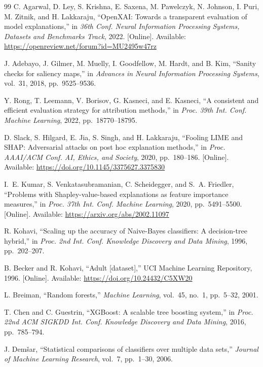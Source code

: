 \documentclass{cleiej}
\begin{document}
\begin{thebibliography}{99}
C. Agarwal, D. Ley, S. Krishna, E. Saxena, M. Pawelczyk, N. Johnson,
I. Puri, M. Zitnik, and H. Lakkaraju, ``OpenXAI: Towards a transparent
evaluation of model explanations,'' in \emph{36th Conf. Neural Information
Processing Systems, Datasets and Benchmarks Track}, 2022. [Online].
Available: \url{https://openreview.net/forum?id=MU2495w47rz}

J. Adebayo, J. Gilmer, M. Muelly, I. Goodfellow, M. Hardt, and B. Kim,
``Sanity checks for saliency maps,'' in \emph{Advances in Neural
Information Processing Systems}, vol.~31, 2018, pp.~9525--9536.

Y. Rong, T. Leemann, V. Borisov, G. Kasneci, and E. Kasneci, ``A consistent
and efficient evaluation strategy for attribution methods,'' in \emph{Proc.
39th Int. Conf. Machine Learning}, 2022, pp.~18770--18795.

D. Slack, S. Hilgard, E. Jia, S. Singh, and H. Lakkaraju, ``Fooling LIME
and SHAP: Adversarial attacks on post hoc explanation methods,'' in
\emph{Proc. AAAI/ACM Conf. AI, Ethics, and Society}, 2020, pp.~180--186.
[Online]. Available: \url{https://doi.org/10.1145/3375627.3375830}

I.~E. Kumar, S. Venkatasubramanian, C. Scheidegger, and S.~A. Friedler,
``Problems with Shapley-value-based explanations as feature importance
measures,'' in \emph{Proc. 37th Int. Conf. Machine Learning}, 2020,
pp.~5491--5500. [Online]. Available: \url{https://arxiv.org/abs/2002.11097}

R. Kohavi, ``Scaling up the accuracy of Naive-Bayes classifiers: A
decision-tree hybrid,'' in \emph{Proc. 2nd Int. Conf. Knowledge Discovery
and Data Mining}, 1996, pp.~202--207.

B. Becker and R. Kohavi, ``Adult [dataset],'' UCI Machine Learning
Repository, 1996. [Online]. Available:
\url{https://doi.org/10.24432/C5XW20}

L. Breiman, ``Random forests,'' \emph{Machine Learning}, vol.~45, no.~1,
pp.~5--32, 2001.

T. Chen and C. Guestrin, ``XGBoost: A scalable tree boosting system,'' in
\emph{Proc. 22nd ACM SIGKDD Int. Conf. Knowledge Discovery and Data
Mining}, 2016, pp.~785--794.

J. Dem\v{s}ar, ``Statistical comparisons of classifiers over multiple data
sets,'' \emph{Journal of Machine Learning Research}, vol.~7, pp.~1--30,
2006.


\end{thebibliography}
\end{document}
